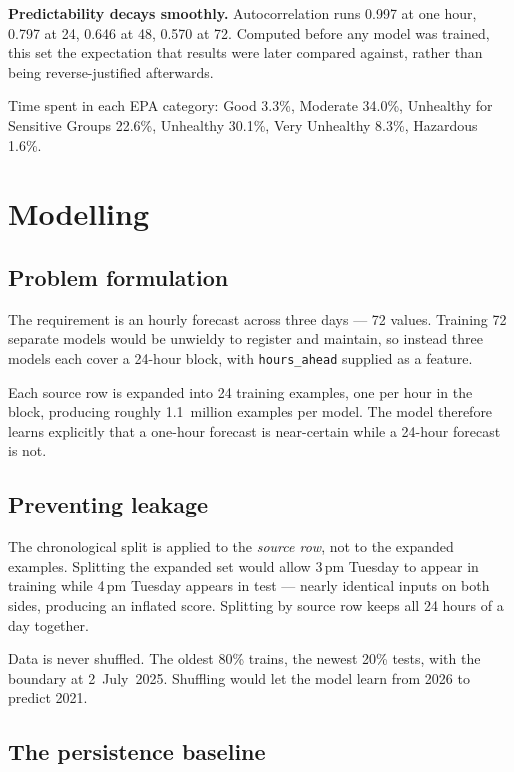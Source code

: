\documentclass[11pt,a4paper]{article}
\begin{document}
\textbf{Predictability decays smoothly.} Autocorrelation runs 0.997 at
one hour, 0.797 at 24, 0.646 at 48, 0.570 at 72. Computed before any
model was trained, this set the expectation that results were later
compared against, rather than being reverse-justified afterwards.

Time spent in each EPA category: Good 3.3\%, Moderate 34.0\%, Unhealthy
for Sensitive Groups 22.6\%, Unhealthy 30.1\%, Very Unhealthy 8.3\%,
Hazardous 1.6\%.

\section{Modelling}

\subsection{Problem formulation}

The requirement is an hourly forecast across three days --- 72 values.
Training 72 separate models would be unwieldy to register and maintain,
so instead three models each cover a 24-hour block, with
\texttt{hours\_ahead} supplied as a feature.

Each source row is expanded into 24 training examples, one per hour in
the block, producing roughly 1.1~million examples per model. The model
therefore learns explicitly that a one-hour forecast is near-certain
while a 24-hour forecast is not.

\subsection{Preventing leakage}

The chronological split is applied to the \emph{source row}, not to the
expanded examples. Splitting the expanded set would allow 3\,pm Tuesday
to appear in training while 4\,pm Tuesday appears in test --- nearly
identical inputs on both sides, producing an inflated score. Splitting
by source row keeps all 24 hours of a day together.

Data is never shuffled. The oldest 80\% trains, the newest 20\% tests,
with the boundary at 2~July~2025. Shuffling would let the model learn
from 2026 to predict 2021.

\subsection{The persistence baseline}
\end{document}
